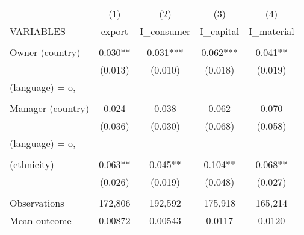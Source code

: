 \begin{tabular}{lcccc} \hline
 & (1) & (2) & (3) & (4) \\
VARIABLES & export & I\_consumer & I\_capital & I\_material \\ \hline
 &  &  &  &  \\
Owner (country) & 0.030** & 0.031*** & 0.062*** & 0.041** \\
 & (0.013) & (0.010) & (0.018) & (0.019) \\
(language) = o, & - & - & - & - \\
 &  &  &  &  \\
Manager (country) & 0.024 & 0.038 & 0.062 & 0.070 \\
 & (0.036) & (0.030) & (0.068) & (0.058) \\
(language) = o, & - & - & - & - \\
 &  &  &  &  \\
(ethnicity) & 0.063** & 0.045** & 0.104** & 0.068** \\
 & (0.026) & (0.019) & (0.048) & (0.027) \\
 &  &  &  &  \\
Observations & 172,806 & 192,592 & 175,918 & 165,214 \\
 Mean outcome & 0.00872 & 0.00543 & 0.0117 & 0.0120 \\ \hline
\end{tabular}
